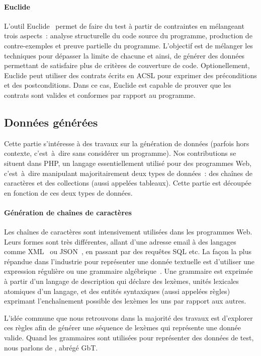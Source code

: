 \paragraph{Euclide} L'outil Euclide~ permet de faire du test à
partir de contrain\-tes en mélangeant trois aspects~: analyse structurelle du
code source du programme, production de contre-exemples et preuve partielle du
programme. L'objectif est de mélanger les techniques pour dépasser la limite de
chacune et ainsi, de générer des données permettant de satisfaire plus de
critères de couverture de code. Optionellement, Euclide peut utiliser des
contrats écrits en ACSL pour exprimer des préconditions et des postconditions.
Dans ce cas, Euclide est capable de prouver que les contrats sont valides et
conformes par rapport au programme.

\subsection{Données générées}

Cette partie s'intéresse à des travaux sur la génération de données (parfois
hors contexte, c'est~à~dire sans considérer un programme). Nos contributions se
situent dans PHP, un langage essentiellement utilisé pour des programmes Web,
c'est~à~dire manipulant majoritairement deux types de données~: des chaînes de
caractères et des collections (aussi appelées tableaux). Cette partie est
découpée en fonction de ces deux types de données.

\paragraph{Génération de chaînes de caractères} Les chaînes de caractères sont
intensivement utilisées dans les programmes Web. Leurs formes sont très
différentes, allant d'une adresse email à des langages comme XML~ ou
JSON~, en passant par des requêtes SQL etc. La façon la plus
répandue dans l'industrie pour représenter une donnée textuelle est d'utiliser
une expression régulière ou une grammaire algébrique~. Une
grammaire est exprimée à partir d'un langage de description qui déclare des
lexèmes, unités lexicales atomiques d'un langage, et des entités syntaxiques
(aussi appelées règles) exprimant l'enchaînement possible des lexèmes les uns
par rapport aux autres.

L'idée commune que nous retrouvons dans la majorité des travaux est d'explorer
ces règles afin de générer une séquence de lexèmes qui représente une donnée
valide. Quand les grammaires sont utilisées pour représenter des données de
test, nous parlons de , abrégé GbT.

